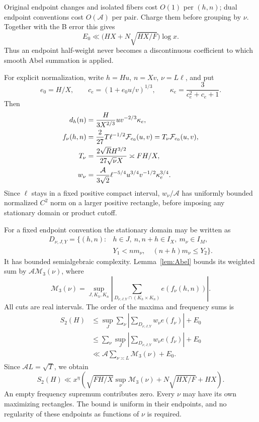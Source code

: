 \documentclass[11pt,a4paper]{article}
\numberwithin{equation}{section}
\theoremstyle{remark}
\begin{document}
Original endpoint changes and isolated fibers cost $O(1)$ per $(h,n)$;
dual endpoint conventions cost $O(\mathcal A)$ per pair. Charge them
before grouping by $\nu$. Together with the B error this gives
\begin{equation}\label{eq:Err0}
 E_0\ll \bigl(HX+N\sqrt{HX/F}\bigr)\log x.
\end{equation}
Thus an endpoint half-weight never becomes a discontinuous coefficient
to which smooth Abel summation is applied.

For explicit normalization, write $h=Hu$, $n=Xv$, $\nu=L\ell$, and put
\[
 e_0=H/X,\qquad c_e=(1+e_0u/v)^{1/3},\qquad
 \kappa_e=\frac3{c_e^2+c_e+1}.
\]
Then
\begin{align}
 d_h(n)&=\frac{H}{3X^{2/3}}u v^{-2/3}\kappa_e,\notag\\
 f_\nu(h,n)&=\frac2{27}T\ell^{-1/2}\mathcal F_{e_0}(u,v)
            =T_\nu\mathcal F_{e_0}(u,v),\label{eq:normalized-firstB}\\
 T_\nu&=\frac{2\sqrt R H^{3/2}}{27\sqrt\nu X}\asymp FH/X,\notag\\
 w_\nu&=\frac{\mathcal A}{3\sqrt2}
       \ell^{-5/4}u^{3/4}v^{-1/2}\kappa_e^{3/4}.\notag
\end{align}
Since $\ell$ stays in a fixed positive compact interval, $w_\nu/\mathcal A$
has uniformly bounded normalized $C^2$ norm on a larger positive rectangle,
before imposing any stationary domain or product cutoff.

For a fixed endpoint convention the stationary domain may be written as
\begin{align*}
 D_{\nu,J,Y}=\{(h,n):
 &h\in J,\ n,n+h\in I_X,\ m_\nu\in I_M,\\
 &Y_1<n m_\nu,\quad (n+h)m_\nu\le Y_2\}.
\end{align*}
It has bounded semialgebraic complexity. Lemma~\ref{lem:Abel} bounds its
weighted sum by $\mathcal A\mathcal M_3(\nu)$, where
\[
 \mathcal M_3(\nu)=
 \sup_{J,K_h,K_n}
 \left|\sum_{D_{\nu,J,Y}\cap(K_h\times K_n)}e(f_\nu(h,n))\right|.
\]
All cuts are real intervals. The order of the maxima and frequency sums is
\begin{align*}
 S_2(H)&\le
 \sup_J\sum_\nu\left|\sum_{D_{\nu,J,Y}}w_\nu e(f_\nu)\right|+E_0\\
 &\le\sum_\nu\sup_J
         \left|\sum_{D_{\nu,J,Y}}w_\nu e(f_\nu)\right|+E_0\\
 &\ll\mathcal A\sum_{\nu\asymp L}\mathcal M_3(\nu)+E_0.
\end{align*}
Since $\mathcal A L=\sqrt T$, we obtain
\begin{equation}\label{eq:A1}
 S_2(H)\ll x^\eta\left(
       \sqrt{FH/X}\sup_\nu\mathcal M_3(\nu)
       +N\sqrt{HX/F}+HX\right).
\end{equation}
An empty frequency supremum contributes zero. Every $\nu$ may have its own
maximizing rectangles. The bound is uniform in their endpoints, and no
regularity of these endpoints as functions of $\nu$ is required.
\end{document}
